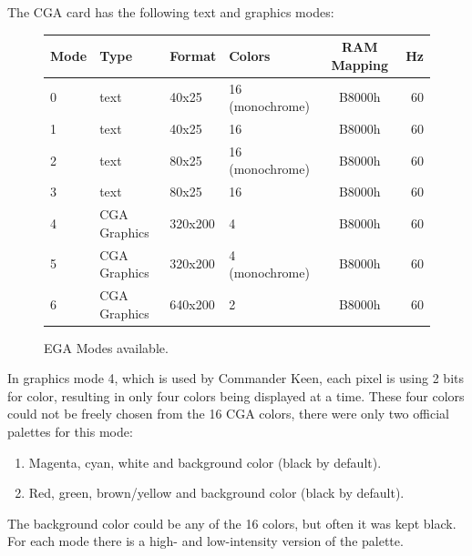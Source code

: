 \documentclass[book.tex]{subfiles}
\begin{document}
The CGA card has the following text and graphics modes:\\
\vspace{-10pt}
\begin{figure}[H]
\centering
\begin{table}[H]
\begin{tabularx}{\textwidth}[c]{llllcr}
\hline
\textbf{Mode} & \textbf{Type} & \textbf{Format} & \textbf{Colors} & \hspace{10pt}\textbf{RAM Mapping}\hspace{10pt} & \textbf{Hz}        \\ \hline
0             & text          & 40x25           & 16 (monochrome) & B8000h     & 60                           \\ \hline
1             & text          & 40x25           & 16              & B8000h    & 60                            \\ \hline
2             & text          & 80x25           & 16 (monochrome) & B8000h    & 60                            \\ \hline
3             & text          & 80x25           & 16              & B8000h    & 60                            \\ \hline
4             & CGA Graphics  & 320x200         & 4               & B8000h    & 60                            \\ \hline
5             & CGA Graphics  & 320x200         & 4 (monochrome)  & B8000h    & 60                            \\ \hline
6             & CGA Graphics  & 640x200         & 2               & B8000h    & 60                            \\ \hline

\end{tabularx}
\end{table}
\caption{EGA Modes available.}
\label{ega-modes-available}
 \end{figure} 

In graphics mode 4, which is used by Commander Keen, each pixel is using 2 bits for color, resulting in only four colors being displayed at a time. These four colors could not be freely chosen from the 16 CGA colors, there were only two official palettes for this mode:
\begin{enumerate}
  \item Magenta, cyan, white and background color (black by default).
  \item Red, green, brown/yellow and background color (black by default).
\end{enumerate}
The background color could be any of the 16 colors, but often it was kept black. For each mode there is a high- and low-intensity version of the palette.\\
\end{document}
